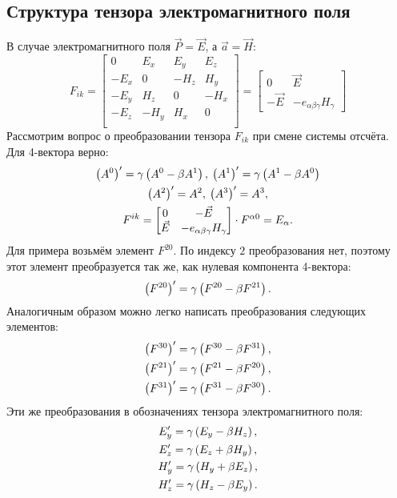 \subsection{Структура тензора электромагнитного поля}
    В случае электромагнитного поля $\vec{P} = \vec{E}$, а $\vec{a} = \vec{H}$:
    \[
        F_{ik} = \begin{bmatrix}
            0 & E_x & E_y & E_z \\
            -E_x & 0 & -H_z & H_y \\
            -E_y & H_z & 0 & -H_x \\
            -E_z & -H_y & H_x & 0 \\
        \end{bmatrix} = \begin{bmatrix}
            0 & \vec{E} \\
            -\vec{E} & -e_{\alpha\beta\gamma}H_{\gamma}
        \end{bmatrix}
    \]
    Рассмотрим вопрос о преобразовании тензора $F_{ik}$ при смене системы отсчёта. Для 4-вектора верно:
    \begin{gather*}
        \left({A^0}\right)' = \gamma\left({A^0 - \beta A^1}\right), \:
        \left({A^1}\right)' = \gamma\left({A^1 - \beta A^0}\right) \\
        \left({A^2}\right)' = A^2, \:
        \left({A^3}\right)' = A^3, \\
        F^{ik} = \begin{bmatrix}
            0 & -\vec{E} \\
            \vec{E} & -e_{\alpha\beta\gamma}H_{\gamma}
        \end{bmatrix} \cdot F^{\alpha 0} = E_{\alpha}.
    \end{gather*}
    Для примера возьмём элемент $F^{20}$. По индексу $2$ преобразования нет, поэтому этот элемент преобразуется так же, как нулевая компонента 4-вектора:
    \[
        \left({F^{20}}\right)' = \gamma\left({F^{20} - \beta F^{21}}\right).
    \]
    Аналогичным образом можно легко написать преобразования следующих элементов:
    \begin{gather*}
        \left({F^{30}}\right)' = \gamma\left({F^{30} - \beta F^{31}}\right), \\
        \left({F^{21}}\right)' = \gamma\left({F^{21} - \beta F^{20}}\right), \\
        \left({F^{31}}\right)' = \gamma\left({F^{31} - \beta F^{30}}\right).
    \end{gather*}
    Эти же преобразования в обозначениях тензора электромагнитного поля:
    \begin{gather*}
        E_y' = \gamma\left({E_y - \beta H_z}\right), \\
        E_z' = \gamma\left({E_z + \beta H_y}\right), \\
        H_y' = \gamma\left({H_y + \beta E_z}\right), \\
        H_z' = \gamma\left({H_z - \beta E_y}\right).
    \end{gather*}
